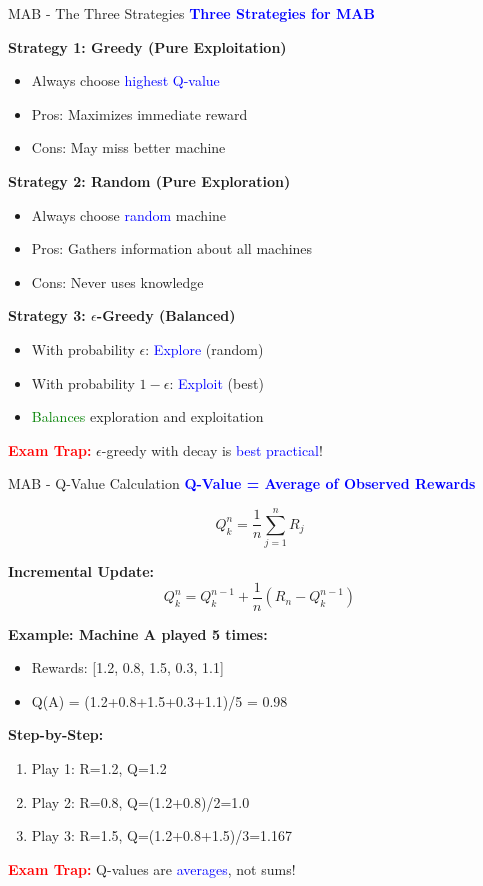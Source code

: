\documentclass[8pt]{beamer}
\begin{document}
	\begin{frame}{MAB - The Three Strategies}
		\fontsize{6.5}{7.5}\selectfont
		\textcolor{blue}{\textbf{Three Strategies for MAB}}
		
		\textbf{Strategy 1: Greedy (Pure Exploitation)}
		\begin{itemize}
			\item Always choose \textcolor{blue}{highest Q-value}
			\item Pros: Maximizes immediate reward
			\item Cons: May miss better machine
		\end{itemize}
		
		\textbf{Strategy 2: Random (Pure Exploration)}
		\begin{itemize}
			\item Always choose \textcolor{blue}{random} machine
			\item Pros: Gathers information about all machines
			\item Cons: Never uses knowledge
		\end{itemize}
		
		\textbf{Strategy 3: $\epsilon$-Greedy (Balanced)}
		\begin{itemize}
			\item With probability $\epsilon$: \textcolor{blue}{Explore} (random)
			\item With probability $1-\epsilon$: \textcolor{blue}{Exploit} (best)
			\item \textcolor{green}{Balances} exploration and exploitation
		\end{itemize}
		
		\textcolor{red}{\textbf{Exam Trap:}} $\epsilon$-greedy with decay is \textcolor{blue}{best practical}!
	\end{frame}
	
	\begin{frame}{MAB - Q-Value Calculation}
		\fontsize{6.5}{7.5}\selectfont
		\textcolor{blue}{\textbf{Q-Value = Average of Observed Rewards}}
		
		\[
		Q_k^n = \frac{1}{n}\sum_{j=1}^n R_j
		\]
		
		\textbf{Incremental Update:}
		\[
		Q_k^n = Q_k^{n-1} + \frac{1}{n}(R_n - Q_k^{n-1})
		\]
		
		\textbf{Example: Machine A played 5 times:}
		\begin{itemize}
			\item Rewards: [1.2, 0.8, 1.5, 0.3, 1.1]
			\item Q(A) = (1.2+0.8+1.5+0.3+1.1)/5 = 0.98
		\end{itemize}
		
		\textbf{Step-by-Step:}
		\begin{enumerate}
			\item Play 1: R=1.2, Q=1.2
			\item Play 2: R=0.8, Q=(1.2+0.8)/2=1.0
			\item Play 3: R=1.5, Q=(1.2+0.8+1.5)/3=1.167
		\end{enumerate}
		
		\textcolor{red}{\textbf{Exam Trap:}} Q-values are \textcolor{blue}{averages}, not sums!
	\end{frame}
	
\end{document}
